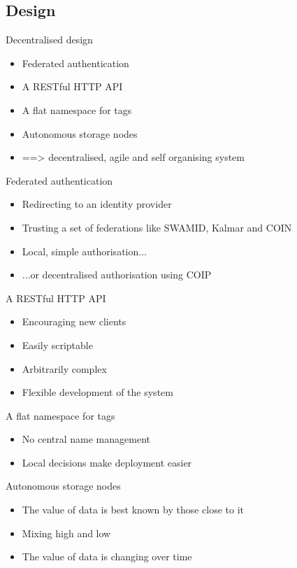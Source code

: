 \documentclass{beamer}
\begin{document}
\subsection{Design}
\begin{frame}{Decentralised design}
  \begin{itemize}
  \item
    Federated authentication
  \item
    A RESTful HTTP API
  \item
    A flat namespace for tags
  \item
    Autonomous storage nodes 
  \item
    ==> decentralised, agile and self organising system
  \end{itemize}
\end{frame}
\begin{frame}{Federated authentication}
  \begin{itemize}
  \item
    Redirecting to an identity provider
  \item
    Trusting a set of federations like SWAMID, Kalmar and COIN
  \item
    Local, simple authorisation...
  \item
    ...or decentralised authorisation using COIP
  \end{itemize}
\end{frame}

\begin{frame}{A RESTful HTTP API}
  \begin{itemize}
  \item
    Encouraging new clients
  \item
    Easily scriptable
  \item
    Arbitrarily complex
  \item
    Flexible development of the system
  \end{itemize}
\end{frame}

\begin{frame}{A flat namespace for tags}
  \begin{itemize}
  \item
    No central name management
  \item
    Local decisions make deployment easier
  \end{itemize}
\end{frame}

\begin{frame}{Autonomous storage nodes}
  \begin{itemize}
  \item
    The value of data is best known by those close to it
  \item
    Mixing high and low
  \item
    The value of data is changing over time
  \end{itemize}
\end{frame}
\end{document}
